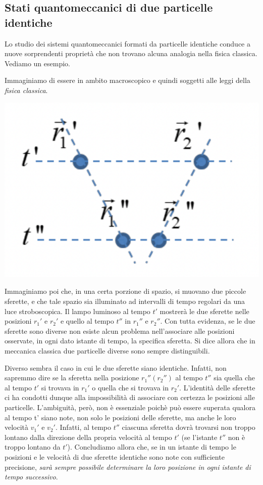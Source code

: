 \subsection{Stati quantomeccanici di due particelle identiche}\label{sec:particelle-identiche}

Lo studio dei sistemi quantomeccanici formati da particelle identiche conduce a nuove
sorprendenti proprietà che non trovano alcuna analogia nella fisica
classica.
Vediamo un esempio.

Immaginiamo di essere in ambito macroscopico e quindi soggetti alle
leggi della \emph{fisica classica}.
\begin{marginfigure}
	\includegraphics{figs/identical-part1}
	\label{fig:identical-part1}
\end{marginfigure}
Immaginiamo poi che, in una certa porzione di spazio, si muovano due
piccole sferette, e che tale spazio sia illuminato ad intervalli di
tempo regolari da una luce stroboscopica.
Il lampo luminoso al tempo
\(t'\) mostrerà le due sferette nelle posizioni \(r_{1}'\) e \(r_{2}'\)
e quello al tempo \(t''\) in \(r_{1}''\) e \(r_{2}''\).
Con tutta
evidenza, se le due sferette sono diverse non esiste alcun problema
nell'associare alle posizioni osservate, in ogni dato istante di tempo,
la specifica sferetta.
Si dice allora che in meccanica classica due
particelle diverse sono sempre distinguibili.

Diverso sembra il caso in cui le due sferette siano identiche.
Infatti,
non sapremmo dire se la sferetta nella posizione \(r_{1}''(r_{2}'')\) al
tempo \(t''\) sia quella che al tempo \(t'\) si trovava in \(r_{1}'\) o
quella che si trovava in \(r_{2}'\).
L'identità delle sferette ci ha
condotti dunque alla impossibilità di associare con certezza le
posizioni alle particelle.
L'ambiguità, però, non è essenziale poichè
può essere superata qualora al tempo t' siano note, non solo le
posizioni delle sferette, ma anche le loro velocità \(v_1'\) e \(v_2'\).
Infatti, al tempo \(t''\) ciascuna sferetta dovrà trovarsi non troppo
lontano dalla direzione della propria velocità al tempo \(t'\) (se
l'istante \(t''\) non è troppo lontano da \(t'\)).
Concludiamo allora
che, se in un istante di tempo le posizioni e le velocità di due
sferette identiche sono note con sufficiente precisione, \emph{sarà sempre
possibile determinare la loro posizione in ogni istante di tempo
successivo}.

